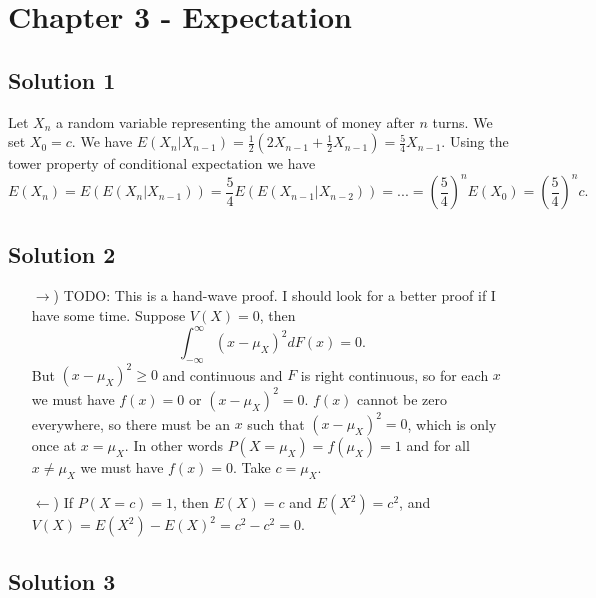 \section*{Chapter 3 - Expectation}

\subsection*{Solution 1}

Let $X_n$ a random variable representing the amount of money after $n$ turns.
We set $X_0 = c$.
We have $E(X_n | X_{n-1}) = \frac{1}{2}(2 X_{n-1} + \frac{1}{2} X_{n-1}) = \frac{5}{4} X_{n-1}$.
Using the tower property of conditional expectation we have
\begin{equation*}
    E(X_n) = E(E(X_n | X_{n-1}))
        = \frac{5}{4} E(E(X_{n-1} | X_{n-2}))
        = ...
        = \left(\frac{5}{4}\right)^n E(X_0)
        = \left(\frac{5}{4}\right)^n c.
\end{equation*}


\subsection*{Solution 2}

\begin{itemize}
    \item[$\rightarrow$)] TODO: This is a hand-wave proof. I should look for a better proof if I have some time.
        Suppose $V(X) = 0$, then
        \begin{equation*}
            \int_{-\infty}^{\infty} (x - \mu_X)^2 dF(x) = 0.
        \end{equation*}
        But $(x - \mu_X)^2 \geq 0$ and continuous and $F$ is right continuous, so for each $x$ we must have $f(x) = 0$ or $(x - \mu_X)^2 = 0$.
        $f(x)$ cannot be zero everywhere, so there must be an $x$ such that $(x - \mu_X)^2 = 0$, which is only once at $x = \mu_X$.
        In other words $P(X = \mu_X) = f(\mu_X) = 1$ and for all $x \neq \mu_X$ we must have $f(x) = 0$.
        Take $c = \mu_X$.
    \item[$\leftarrow$)] If $P(X = c) = 1$, then $E(X) = c$ and $E(X^2) = c^2$, and $V(X) = E(X^2) - E(X)^2 = c^2 - c^2 = 0$.
\end{itemize}


\subsection*{Solution 3}


